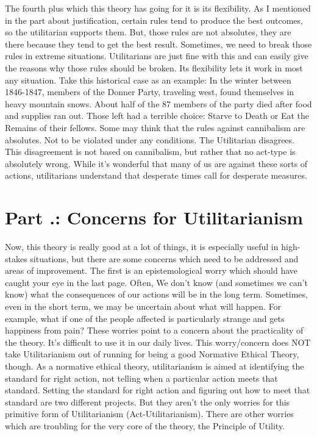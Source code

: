 The fourth plus which this theory has going for it is its flexibility. As I mentioned in the part about justification, certain rules tend to produce the best outcomes, so the utilitarian supports them. But, those rules are not absolutes, they are there because they tend to get the best result. Sometimes, we need to break those rules in extreme situations. Utilitarians are just fine with this and can easily give the reasons why those rules should be broken. Its flexibility lets it work in most any situation. Take this historical case as an example: In the winter between 1846-1847, members of the Donner Party, traveling west, found themselves in heavy mountain snows. About half of the 87 members of the party died after food and supplies ran out. Those left had a terrible choice: Starve to Death or Eat the Remains of their fellows. Some may think that the rules against cannibalism are absolutes. Not to be violated under any conditions. The Utilitarian disagrees. This disagreement is not based on cannibalism, but rather that no act-type is absolutely wrong. While it’s wonderful that many of us are against these sorts of actions, utilitarians understand that desperate times call for desperate measures.

\section{Part \thechapcount.\theseccount: Concerns for Utilitarianism}

Now, this theory is really good at a lot of things, it is especially useful in high-stakes situations, but there are some concerns which need to be addressed and areas of improvement. The first is an epistemological worry which should have caught your eye in the last page. Often, We don’t know (and sometimes we can't know) what the consequences of our actions will be in the long term. Sometimes, even in the short term, we may be uncertain about what will happen. For example, what if one of the people affected is particularly strange and gets happiness from pain? These worries point to a concern about the practicality of the theory.  It's difficult to use it in our daily lives. This worry/concern does NOT take Utilitarianism out of running for being a good Normative Ethical Theory, though. As a normative ethical theory, utilitarianism is aimed at identifying the standard for right action, not telling when a particular action meets that standard. Setting the standard for right action and figuring out how to meet that standard are two different projects. But they aren't the only worries for this primitive form of Utilitarianism (Act-Utilitarianism). There are other worries which are troubling for the very core of the theory, the Principle of Utility.

